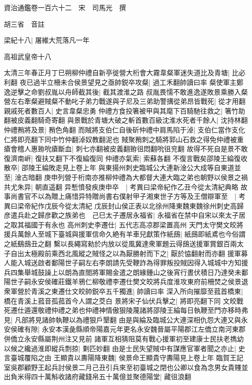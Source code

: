 資治通鑑卷一百六十二　宋　司馬光　撰

胡三省　音註

梁紀十八|{
	屠維大荒落凡一年}


高祖武皇帝十八

太清三年春正月丁巳朔柳仲禮自新亭徙營大桁會大霧韋粲軍迷失道比及青塘|{
	比必利翻}
夜已過半立柵未合侯景望見之亟帥鋭卒攻粲|{
	過工禾翻帥讀曰率}
粲使軍主鄭逸逆擊之命劉叔胤以舟師截其後|{
	截其渡淮之路}
叔胤畏懦不敢進逸遂敗景乘勝入粲營左右牽粲避賊粲不動叱子弟力戰遂與子尼及三弟助警搆從弟昂皆戰死|{
	從才用翻}
親戚死者數百人|{
	史言韋粲忠勇}
仲禮方食投箸被甲與其麾下百騎馳往救之|{
	箸竹助翻被皮義翻騎奇寄翻}
與景戰於青塘大破之斬首數百級沈淮水死者千餘人|{
	沈持林翻}
仲禮矟將及景|{
	矟色角翻}
而賊將支伯仁自後斫仲禮中肩馬陷于淖|{
	支伯仁當作支化仁將即亮翻下同中竹仲翻淖奴教翻泥也}
賊聚矟刺之騎將郭山石救之得免仲禮被重瘡會稽人惠臶吮瘡斷血|{
	刺七亦翻被皮義翻臶徂悶翻吮徂兖翻}
故得不死自是景不敢復濟南㟁|{
	復扶又翻下不復綸復同}
仲禮亦氣索|{
	索蘇各翻}
不復言戰矣邵陵王綸復收散卒|{
	邵陵王綸敗走見上卷上年}
與東揚州刺史臨城公大連新淦公大成等自東道並至|{
	淦古暗翻}
庚申列營于桁南亦推柳仲禮為大都督大連大臨之弟也朝野以侯景之禍共尤朱异|{
	朝直遥翻}
异慙憤發疾庚申卒　|{
	考異曰梁帝紀作乙丑今從太清紀典略}
故事尚書官不以為贈上痛惜异特贈尚書右僕射甲子湘東世子方等及王僧辯軍至　|{
	考異曰梁帝紀作戊辰今從太清紀}
戊辰封山侯正表以北徐州降東魏東魏徐州刺史高歸彦遣兵赴之歸彦歡之族弟也　己巳太子遷居永福省|{
	永福省在禁中自宋以來太子居之取其福國于有永也}
高州刺史李遷仕|{
	五代志高凉郡梁置高州}
天門太守樊文皎將援兵萬餘人至城下臺城與援軍信命久絶有羊車兒獻策作紙䲭|{
	紙䲭即紙鳶也今俗謂之紙鷂䲭丑之翻}
繫以長繩寫勑於内放以從風冀達衆軍題云得䲭送援軍賞銀百兩太子自出太極殿前乘西北風縱之賊怪之以為厭勝射而下之|{
	厭於恊翻射而亦翻}
援軍募人能入城送啟者鄱陽世子嗣左右李朗請先受鞭詐為得罪叛投賊因得入城城中方知援兵四集舉城鼓譟上以朗為直閤將軍賜金遣之朗緣鍾山之後宵行晝伏積日乃達癸未鄱陽世子嗣永安侯確莊鐵羊鴉仁柳敬禮李遷仕樊文皎將兵度淮攻東府前柵焚之侯景退衆軍營於青溪之東遷仕文皎帥鋭卒五千獨進|{
	帥讀曰率}
深入所向摧靡至菰首橋東|{
	橋在青溪上菰音孤菰首今人謂之茭白}
景將宋子仙伏兵擊之|{
	將即亮翻下同}
文皎戰死遷仕遁還敬禮仲禮之弟也仲禮神情傲狠陵蔑諸將邵陵王綸每日執鞭至門亦移時弗見|{
	凡部將見諸帥執鞭以為禮狠戶墾翻}
由是與綸及臨城公大連深相仇怨大連又與永安侯確有隙|{
	永安本漢彘縣順帝陽嘉元年更名永安魏晉屬平陽郡江左僑立南河東郡併僑立永安縣屬荆州注又見前}
諸軍互相猜阻莫有戰心援軍初至建康士民扶老擕幼以候之纔過淮即縱兵剽掠|{
	㔄匹妙翻}
由是士民失望賊中有謀應官軍者聞之亦止|{
	史言臺城覆陷之由}
王顯貴以夀陽降東魏|{
	侯景命王顯貴守夀陽見上卷上年}
臨賀王記室吳郡顧野王起兵討侯景二月己丑引兵來至初臺城之閉也公卿以食為念男女貴賤並出負米得四十萬斛收諸府藏錢帛五十萬億並聚德陽堂|{
	藏徂浪翻}
